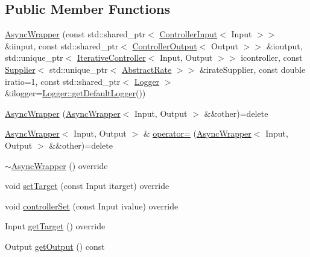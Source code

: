 \subsection*{Public Member Functions}
\begin{DoxyCompactItemize}
\item 
\mbox{\hyperlink{classokapi_1_1AsyncWrapper_adbbf06146d19a3fd5747f6ddd8bc084e}{Async\+Wrapper}} (const std\+::shared\+\_\+ptr$<$ \mbox{\hyperlink{classokapi_1_1ControllerInput}{Controller\+Input}}$<$ Input $>$$>$ \&iinput, const std\+::shared\+\_\+ptr$<$ \mbox{\hyperlink{classokapi_1_1ControllerOutput}{Controller\+Output}}$<$ Output $>$$>$ \&ioutput, std\+::unique\+\_\+ptr$<$ \mbox{\hyperlink{classokapi_1_1IterativeController}{Iterative\+Controller}}$<$ Input, Output $>$$>$ icontroller, const \mbox{\hyperlink{classokapi_1_1Supplier}{Supplier}}$<$ std\+::unique\+\_\+ptr$<$ \mbox{\hyperlink{classokapi_1_1AbstractRate}{Abstract\+Rate}} $>$$>$ \&irate\+Supplier, const double iratio=1, const std\+::shared\+\_\+ptr$<$ \mbox{\hyperlink{classokapi_1_1Logger}{Logger}} $>$ \&ilogger=\mbox{\hyperlink{classokapi_1_1Logger_a5053cf778b4b55acba788a3797dc96d2}{Logger\+::get\+Default\+Logger}}())
\item 
\mbox{\hyperlink{classokapi_1_1AsyncWrapper_a6824804fd4c85627d6af2a563ea9fcf0}{Async\+Wrapper}} (\mbox{\hyperlink{classokapi_1_1AsyncWrapper}{Async\+Wrapper}}$<$ Input, Output $>$ \&\&other)=delete
\item 
\mbox{\hyperlink{classokapi_1_1AsyncWrapper}{Async\+Wrapper}}$<$ Input, Output $>$ \& \mbox{\hyperlink{classokapi_1_1AsyncWrapper_a6c58083a3bfbeb836cc9a10b23e4bc11}{operator=}} (\mbox{\hyperlink{classokapi_1_1AsyncWrapper}{Async\+Wrapper}}$<$ Input, Output $>$ \&\&other)=delete
\item 
\mbox{\hyperlink{classokapi_1_1AsyncWrapper_a4974501184df515a5c5d911ee2a7b4be}{$\sim$\+Async\+Wrapper}} () override
\item 
void \mbox{\hyperlink{classokapi_1_1AsyncWrapper_aa4b9a4ff29aff5047425e239b574c3c6}{set\+Target}} (const Input itarget) override
\item 
void \mbox{\hyperlink{classokapi_1_1AsyncWrapper_aec6d1a4214bad2151bee23dc5e8076e7}{controller\+Set}} (const Input ivalue) override
\item 
Input \mbox{\hyperlink{classokapi_1_1AsyncWrapper_a2471c7b5f388d441db77fa9199db7b83}{get\+Target}} () override
\item 
Output \mbox{\hyperlink{classokapi_1_1AsyncWrapper_a6f3859f212f0348e73df98c83208f3c4}{get\+Output}} () const

\end{DoxyCompactItemize}
